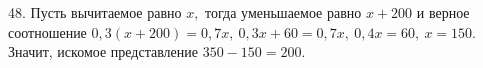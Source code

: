 48. Пусть вычитаемое равно $x,$ тогда уменьшаемое равно $x+200$ и верное соотношение $0,3(x+200)=0,7x,\ 0,3x+60=0,7x,\ 0,4x=60,\ x=150.$ Значит, искомое представление $350-150=200.$\\
